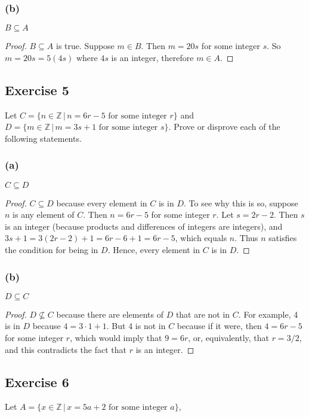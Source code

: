 \documentclass[14pt]{extarticle}
\newcommand{\Z}{\mathbb{Z}}
\begin{document}
\subsubsection{(b)}
\(B \subseteq A\)

\begin{proof}
  \(B \subseteq A\) is true. Suppose $m \in B$. Then $m = 20s$ for some integer $s$. So $m = 20s = 5(4s)$ where $4s$
  is an integer, therefore $m \in A$.
\end{proof}

\subsection{Exercise 5}
Let \(C = \{n \in \Z \, | \, n = 6r-5 \text{ for some integer } r\}\) and \(D = \{m \in \Z \, | \, m = 3s+1
\text{ for some integer } s\}\). Prove or disprove each of the following statements.

\subsubsection{(a)}
\(C \subseteq D\)

\begin{proof}
  \(C \subseteq D\) because every element in $C$ is in $D$. To see why this is so, suppose $n$ is any element of $C$.
  Then \(n = 6r - 5\) for some integer $r$. Let \(s = 2r - 2\). Then $s$ is an integer (because products and
  differences of integers are integers), and \(3s + 1 = 3(2r - 2) + 1 = 6r - 6 + 1 = 6r - 5\), which equals $n$. Thus
  $n$ satisfies the condition for being in $D$. Hence, every element in $C$ is in $D$.
\end{proof}

\subsubsection{(b)}
\(D \subseteq C\)

\begin{proof}
  \(D \nsubseteq C\) because there are elements of $D$ that are not in $C$. For example, 4 is in $D$ because
  \(4 = 3 \cdot 1 + 1\). But 4 is not in $C$ because if it were, then \(4 = 6r - 5\) for some integer $r$, which would
  imply that \(9 = 6r\), or, equivalently, that \(r = 3/2\), and this contradicts the fact that $r$ is an integer.
\end{proof}


\subsection{Exercise 6}
Let \(A = \{x \in \Z \, | \, x = 5a+2 \text{ for some integer } a\}\),
\end{document}
